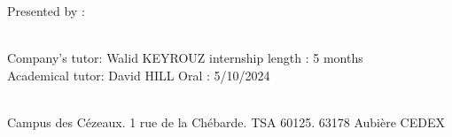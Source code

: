\begin{titlepage}
\begin{center}
    \vspace{1.5cm}
    \begin{large}
      Presented by : \textbf{\authorName}\\
    \end{large}
  \end{center}

  \vspace{4cm}~\\
  Company's tutor: Walid KEYROUZ \hfill internship length : 5 months\\
  Academical tutor: David HILL \hfill Oral : 5/10/2024\\~\\

  \begin{center}
    \begin{small}
      Campus des Cézeaux. 1 rue de la Chébarde. TSA 60125. 63178 Aubière CEDEX\par
    \end{small}
  \end{center}
\end{titlepage}
